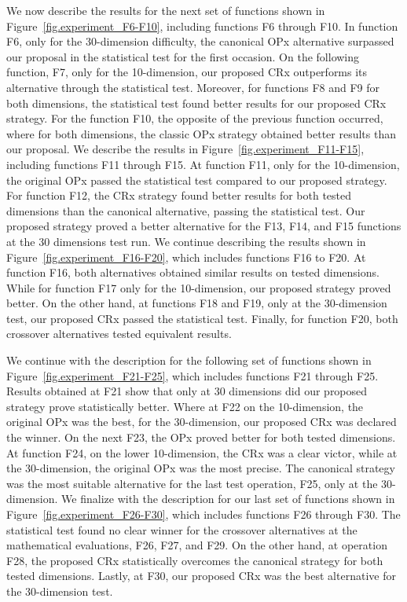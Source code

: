 \documentclass[graybox]{svmult}
\begin{document}
    We now describe the results for the next set of functions shown in Figure~\ref{fig.experiment_F6-F10}, including functions F6 through F10. In function F6, only for the 30-dimension difficulty, the canonical OPx alternative surpassed our proposal in the statistical test for the first occasion. On the following function, F7, only for the 10-dimension, our proposed CRx outperforms its alternative through the statistical test. Moreover, for functions F8 and F9 for both dimensions, the statistical test found better results for our proposed CRx strategy. For the function F10, the opposite of the previous function occurred, where for both dimensions, the classic OPx strategy obtained better results than our proposal. We describe the results in Figure~\ref{fig.experiment_F11-F15}, including functions F11 through F15. At function F11, only for the 10-dimension, the original OPx passed the statistical test compared to our proposed strategy. For function F12, the CRx strategy found better results for both tested dimensions than the canonical alternative, passing the statistical test. Our proposed strategy proved a better alternative for the F13, F14, and F15 functions at the 30 dimensions test run. We continue describing the results shown in Figure~\ref{fig.experiment_F16-F20}, which includes functions F16 to F20. At function F16, both alternatives obtained similar results on tested dimensions. While for function F17 only for the 10-dimension, our proposed strategy proved better. On the other hand, at functions F18 and F19, only at the 30-dimension test, our proposed CRx passed the statistical test. Finally, for function F20, both crossover alternatives tested equivalent results.

    We continue with the description for the following set of functions shown in Figure~\ref{fig.experiment_F21-F25}, which includes functions F21 through F25. Results obtained at F21 show that only at 30 dimensions did our proposed strategy prove statistically better. Where at F22 on the 10-dimension, the original OPx was the best, for the 30-dimension, our proposed CRx was declared the winner. On the next F23, the OPx proved better for both tested dimensions. At function F24, on the lower 10-dimension, the CRx was a clear victor, while at the 30-dimension, the original OPx was the most precise. The canonical strategy was the most suitable alternative for the last test operation, F25, only at the 30-dimension. We finalize with the description for our last set of functions shown in Figure~\ref{fig.experiment_F26-F30}, which includes functions F26 through F30. The statistical test found no clear winner for the crossover alternatives at the mathematical evaluations, F26, F27, and F29. On the other hand, at operation F28, the proposed CRx statistically overcomes the canonical strategy for both tested dimensions. Lastly, at F30, our proposed CRx was the best alternative for the 30-dimension test.
\end{document}
